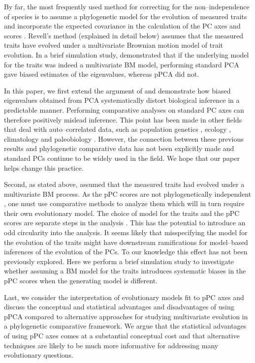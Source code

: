 \documentclass[a4paper,12pt]{article}
\begin{document}
By far, the most frequently used method for correcting for the non--independence of species is to assume a phylogenetic model for the evolution of measured traits and incorporate the expected covariance in the calculation of the PC axes and scores \citep{Revell2008}. Revell's method (explained in detail below) assumes that the measured traits have evolved under a multivariate Brownian motion \citep[BM;][]{Edwards1964} model of trait evolution. In a brief simulation study, \citet{Revell2008} demonstrated that if the underlying model for the traits was indeed a multivariate BM model, performing standard PCA gave biased estimates of the eigenvalues, whereas pPCA did not.

In this paper, we first extend the argument of \citet{Revell2008} and demonstrate how biased eigenvalues obtained from PCA systematically distort biological inference in a predictable manner. Performing comparative analyses on standard PC axes can therefore positively mislead inference. This point has been made in other fields that deal with auto--correlated data, such as population genetics \citep{Novembre}, ecology \citep{Podani2002}, climatology \citep{Richman1986} and paleobiology \citep{Bookstein2012}. However, the connection between these previous results and phylogenetic comparative data has not been explicitly made and standard PCs continue to be widely used in the field. We hope that our paper helps change this practice.

Second, as stated above, \citet{Revell2008} assumed that the measured traits had evolved under a multivariate BM process. As the pPC scores are not phylogenetically independent \citep[][see below]{Revell2008, Polly2013}, one must use comparative methods to analyze them which will in turn require their own evolutionary model. The choice of model for the traits and the pPC scores are separate steps in the analysis \citep{Revell2008}. 
This has the potential to introduce an odd circularity into the analysis. It seems likely that misspecifying the model for the evolution of the traits might have downstream ramifications for model--based inferences of the evolution of the PCs. To our knowledge this effect has not been previously explored. Here we perform a brief simulation study to investigate whether assuming a BM model for the traits introduces systematic biases in the pPC scores when the generating model is different.  

Last, we consider the interpretation of evolutionary models fit to pPC axes and discuss the conceptual and statistical advantages and disadvantages of using pPCA compared to alternative approaches for studying multivariate evolution in a phylogenetic comparative framework. We argue that the statistical advantages of using pPC axes comes at a substantial conceptual cost and that alternative techniques are likely to be much more informative for addressing many evolutionary questions.
\end{document}
